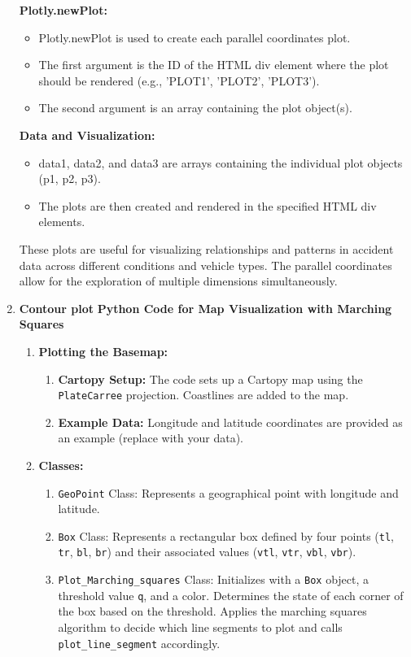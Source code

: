 \documentclass[conference]{IEEEtran}
\begin{document}
\begin{enumerate}
\textbf{Plotly.newPlot:}
\begin{itemize}
    \item Plotly.newPlot is used to create each parallel coordinates plot.
    \item The first argument is the ID of the HTML div element where the plot should be rendered (e.g., 'PLOT1', 'PLOT2', 'PLOT3').
    \item The second argument is an array containing the plot object(s).
\end{itemize}

\textbf{Data and Visualization:}
\begin{itemize}
    \item data1, data2, and data3 are arrays containing the individual plot objects (p1, p2, p3).
    \item The plots are then created and rendered in the specified HTML div elements.
\end{itemize}

These plots are useful for visualizing relationships and patterns in accident data across different conditions and vehicle types. The parallel coordinates allow for the exploration of multiple dimensions simultaneously.\\


    
\item \textbf{Contour plot}
\textbf{Python Code for Map Visualization with Marching Squares}

\begin{enumerate}
    \item \textbf{Plotting the Basemap:}
        \begin{enumerate}
            \item \textbf{Cartopy Setup:} The code sets up a Cartopy map using the \texttt{PlateCarree} projection. Coastlines are added to the map.
            \item \textbf{Example Data:} Longitude and latitude coordinates are provided as an example (replace with your data).
        \end{enumerate}

    \item \textbf{Classes:}
        \begin{enumerate}
            \item \texttt{GeoPoint} Class: Represents a geographical point with longitude and latitude.
            \item \texttt{Box} Class: Represents a rectangular box defined by four points (\texttt{tl}, \texttt{tr}, \texttt{bl}, \texttt{br}) and their associated values (\texttt{vtl}, \texttt{vtr}, \texttt{vbl}, \texttt{vbr}).
            \item \texttt{Plot\_Marching\_squares} Class: Initializes with a \texttt{Box} object, a threshold value \texttt{q}, and a color. Determines the state of each corner of the box based on the threshold. Applies the marching squares algorithm to decide which line segments to plot and calls \texttt{plot\_line\_segment} accordingly.
        \end{enumerate}


\end{enumerate}
\end{enumerate}
\end{document}
